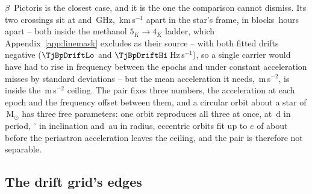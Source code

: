 $\beta$~Pictoris is the closest case, and it is the one the comparison
cannot dismiss. Its two crossings sit at \TjBpNuLo{}
and \TjBpNuHi\,GHz, \TjBpDvKms\,km\,s$^{-1}$ apart in the star's frame, in
blocks \TjBpDtH\,hours apart -- both inside the methanol $5_K\to4_K$ ladder,
which Appendix~\ref{app:linemask} excludes as their source -- with both
fitted drifts negative
($\TjBpDriftLo$ and $\TjBpDriftHi$\,Hz\,s$^{-1}$), so a single carrier would
have had to rise in frequency between the epochs and under constant
acceleration misses by \TjBpNSig{} standard deviations -- but the mean
acceleration it needs, \TjBpAccelReq\,m\,s$^{-2}$, is inside the
\WdAGrid\,m\,s$^{-2}$ ceiling. The pair fixes three numbers, the
acceleration at each epoch and the frequency offset between them, and a
circular orbit about a star of \EcMassBp\,M$_\odot$ \citep{Crifo1997} has
three free parameters: one orbit reproduces all three at once, at
\ObDayBp\,d in period, \ObIncBp$^\circ$ in inclination and \ObAuBp\,au in
radius, eccentric orbits fit up to $e$ of about \ObEccMaxBp{} before the
periastron acceleration leaves the ceiling, and the pair is therefore not
separable.

\begin{table}
\caption{The \WdNExc{} above-trigger readings of the widened recurrence
window, taken to the pairs of Table~\ref{tab:pairs}; each block of rows is
the one above with one effect removed.}
\label{tab:pairacct}
\footnotesize

\end{table}

\subsection{The drift grid's edges}
\label{sec:edge}


